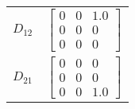 \begin{tabular}{cl}
 $D_{12}$ & $\left[\begin{matrix}0 & 0 & 1.0\\0 & 0 & 0\\0 & 0 & 0\end{matrix}\right]$                                                                              \\
 $D_{21}$ & $\left[\begin{matrix}0 & 0 & 0\\0 & 0 & 0\\0 & 0 & 1.0\end{matrix}\right]$                                                                              \\
\hline
\end{tabular}